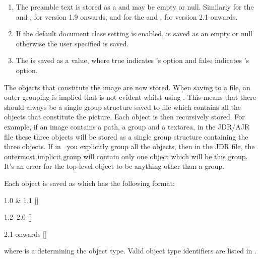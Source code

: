 \begin{numbered}
\begin{enumerate}
\item The preamble text  is stored as a 
and may be empty or null. Similarly for the 
and , for version 1.9 onwards, and for the
 and , for version 2.1 onwards.

\item If the default document class setting is enabled,  is saved as an empty or null  otherwise the user
specified  is saved.

\item The  is saved as a  value,
where true indicates 's 
option and false indicates 's
 option.
\end{enumerate}

\item\label{jdr:object} The \glspl{object} that constitute the
image are now stored.  When saving to a file, an outer grouping is
implied that is not evident whilst using \FlowframTk. This means that
there should always be a single group structure saved to file which
contains all the \glspl{object} that
constitute the picture. Each \gls{object} is then recursively
stored. For example, if an image contains a \gls{path}, a
\gls{group} and a \gls{textarea}, in the
\gls{JDR}/\gls{AJR} file these three objects will be stored as a single
group structure containing the three objects. If in \FlowframTk\ you
explicitly \gls{group} all the objects, then in the
\gls{JDR} file, the \hyperref[jdr:object]{outermost implicit group} will contain
only one \gls{object} which will be this \gls{group}. It's an error
for the top-level object to be anything other than a \gls{group}.

Each \gls{object} is saved as  which has the following format:
\begin{syntaxline}
\begin{jdrversion}{1.0 \& 1.1}
   []
\end{jdrversion}
\begin{jdrversion}{1.2--2.0}
   []
\end{jdrversion}
\begin{jdrversion}{2.1 onwards}
   []
 
\end{jdrversion}
\end{syntaxline}
where  is a  determining the object type.
Valid object type identifiers are listed in
.


\end{numbered}
